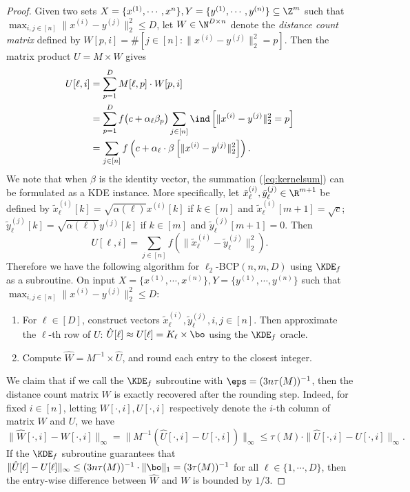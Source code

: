 \begin{proof}
Given two sets $X = \{x^{(1)}, \cdots, x^{n}\}, Y = \{y^{(1)}, \cdots, y^{(n)}\} \subseteq \Z^m$ such that $\max_{i, j \in [n]} \|x^{(i)} - y^{(j)}\|_2^2 \le D$, let $W \in \N^{D \times n}$ denote the \emph{distance count matrix} defined by $W[p, i] = \#[j \in [n]: \|x^{(i)} - y^{(j)}\|_2^2 = p]$. Then the matrix product $U = M \times W$ gives
\begin{align}
U[\ell, i] &= \sum_{p=1}^D M[\ell, p] \cdot W[p, i] \notag\\ 
&=\sum_{p=1}^D f\big(c + \alpha_\ell\beta_p\big) 
\sum_{j \in [n]} \ind\left[\|x^{(i)} - y^{(j)}\|_2^2 = p\right] \notag\\
&=\sum_{j \in [n]} f\left(c + \alpha_\ell \cdot \beta\left[\|x^{(i)} - y^{(j)}\|_2^2\right]\right). \label{eq:kernelsum} 
\end{align}
We note that when $\beta$ is the identity vector, the summation (\ref{eq:kernelsum}) can be formulated as a KDE instance.
More specifically, let $\tilde x_{\ell}^{(i)}, \tilde y_{\ell}^{(j)} \in \R^{m+1}$ be defined by $\tilde x_{\ell}^{(i)}[k] = \sqrt{\alpha(\ell)} x^{(i)}[k]$ if $k \in [m]$ and $\tilde x_{\ell}^{(i)}[m+1] = \sqrt c$;
$\tilde y_{\ell}^{(j)}[k] = \sqrt{\alpha(\ell)} y^{(j)}[k]$ if $k \in [m]$ and $\tilde y_{\ell}^{(j)}[m+1] = 0$. Then
\[U[\ell, i] = \sum_{j \in [n]} f(\|\tilde x_{\ell}^{(i)} - \tilde y_{\ell}^{(j)}\|_2^2).\]
Therefore we have the following algorithm for $\ell_2$\textsf{-BCP}$(n, m, D)$ using $\KDE_f$ as a subroutine. 
On input $X = \{x^{(1)}, \cdots, x^{(n)}\}, Y = \{y^{(1)}, \cdots, y^{(n)}\}$ such that $\max_{i, j \in [n]} \|x^{(i)} - y^{(j)}\|_2^2 \le D$:
\begin{enumerate}
\item For $\ell \in [D]$, construct vectors $\tilde x_{\ell}^{(i)}, \tilde y^{(j)}_{\ell}, i, j \in [n]$.
Then approximate the $\ell$-th row of $U$: $\hat U[\ell] \approx U[\ell] = K_{\ell} \times \bo$ using the $\KDE_f$ oracle.
\item Compute $\hat W = M^{-1} \times \hat U$, and round each entry to the closest integer.
\end{enumerate}

We claim that if we call the $\KDE_f$ subroutine with $\eps = (3n\tau(M))^{-1}$, then the distance count matrix $W$ is exactly recovered after the rounding step.
Indeed, for fixed $i \in [n]$, letting $W[\cdot, i], U[\cdot, i]$ respectively denote the $i$-th column of matrix $W$ and $U$, we have
\[\|\hat W[\cdot, i] - W[\cdot, i]\|_{\infty}
=\|M^{-1}(\hat U[\cdot, i] - U[\cdot, i])\|_{\infty}
\le \tau(M) \cdot \|\hat U[\cdot, i] - U[\cdot, i]\|_{\infty}.\]
If the $\KDE_f$ subroutine guarantees that $\|\hat U[\ell] - U[\ell]\|_{\infty} \le (3n\tau(M))^{-1} \cdot \|\bo\|_{1} = (3\tau(M))^{-1}$ for all $\ell \in \{1, \cdots, D\}$, then the entry-wise difference between $\hat W$ and $W$ is bounded by $1/3$.


\end{proof}

